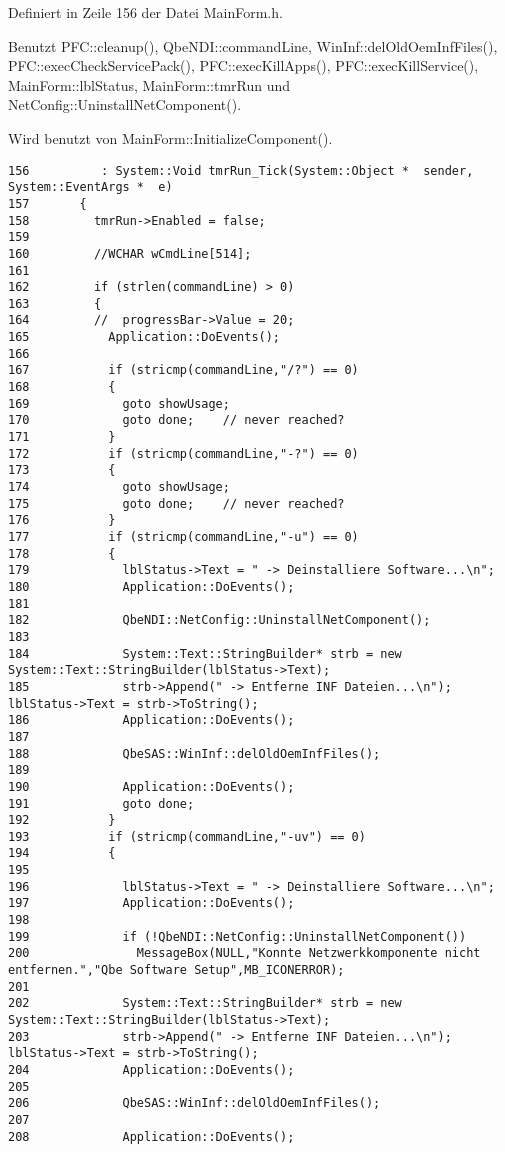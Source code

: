 Definiert in Zeile 156 der Datei Main\-Form.h.

Benutzt PFC::cleanup(), Qbe\-NDI::command\-Line, Win\-Inf::del\-Old\-Oem\-Inf\-Files(), PFC::exec\-Check\-Service\-Pack(), PFC::exec\-Kill\-Apps(), PFC::exec\-Kill\-Service(), Main\-Form::lbl\-Status, Main\-Form::tmr\-Run und Net\-Config::Uninstall\-Net\-Component().

Wird benutzt von Main\-Form::Initialize\-Component().



\footnotesize\begin{verbatim}156          : System::Void tmrRun_Tick(System::Object *  sender, System::EventArgs *  e)
157       {
158         tmrRun->Enabled = false;
159 
160         //WCHAR wCmdLine[514];
161 
162         if (strlen(commandLine) > 0)
163         {
164         //  progressBar->Value = 20;
165           Application::DoEvents();
166 
167           if (stricmp(commandLine,"/?") == 0)
168           {
169             goto showUsage;
170             goto done;    // never reached?
171           }
172           if (stricmp(commandLine,"-?") == 0)
173           {
174             goto showUsage;
175             goto done;    // never reached?
176           }
177           if (stricmp(commandLine,"-u") == 0)
178           {
179             lblStatus->Text = " -> Deinstalliere Software...\n";
180             Application::DoEvents();
181 
182             QbeNDI::NetConfig::UninstallNetComponent();
183 
184             System::Text::StringBuilder* strb = new System::Text::StringBuilder(lblStatus->Text);
185             strb->Append(" -> Entferne INF Dateien...\n"); lblStatus->Text = strb->ToString();
186             Application::DoEvents();
187 
188             QbeSAS::WinInf::delOldOemInfFiles();
189 
190             Application::DoEvents();
191             goto done;
192           }
193           if (stricmp(commandLine,"-uv") == 0)
194           {
195   
196             lblStatus->Text = " -> Deinstalliere Software...\n";
197             Application::DoEvents();
198 
199             if (!QbeNDI::NetConfig::UninstallNetComponent())
200               MessageBox(NULL,"Konnte Netzwerkkomponente nicht entfernen.","Qbe Software Setup",MB_ICONERROR);
201 
202             System::Text::StringBuilder* strb = new System::Text::StringBuilder(lblStatus->Text);
203             strb->Append(" -> Entferne INF Dateien...\n"); lblStatus->Text = strb->ToString();
204             Application::DoEvents();
205 
206             QbeSAS::WinInf::delOldOemInfFiles();
207 
208             Application::DoEvents();

\end{verbatim}
